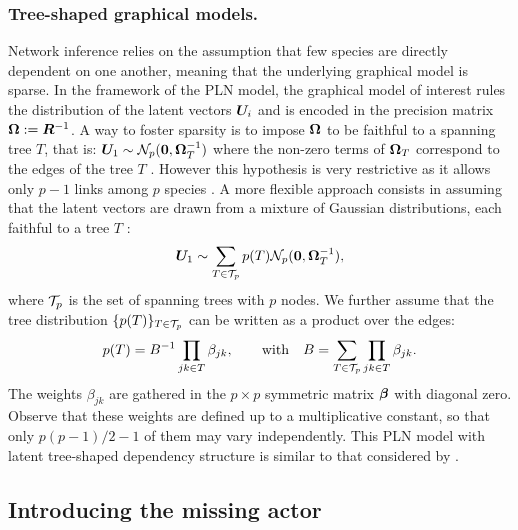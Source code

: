 \subsubsection*{Tree-shaped graphical models.} 
Network inference relies on the assumption that few species are directly dependent on one another, meaning that the underlying graphical model is sparse. In the framework of the PLN model, the graphical model of interest rules the distribution of the latent vectors ${\boldsymbol{U}}_i$ and is  encoded in the precision matrix ${\boldsymbol{\Omega}}:={\boldsymbol{R}}^{-1}$. A way to foster sparsity is to impose ${\boldsymbol{\Omega}}$ to be faithful to a spanning tree $T$, that is: ${\boldsymbol{U}}_1 \sim {\mathcal{N}}_p({\boldsymbol{0}}, {\boldsymbol{\Omega}}_T^{-1})$ where the non-zero terms of ${\boldsymbol{\Omega}}_T$ correspond to the edges of the tree $T$ . However this hypothesis is very restrictive  as it allows only $p-1$ links among $p$ species \citep{ChowLiu}. A more flexible approach consists in assuming that the latent vectors are drawn from a mixture of Gaussian distributions, each faithful to a tree $T$ \citep{MixtTrees,MeilaJaak,kirshner,SRS19}:
\begin{equation} \label{eq:mixt-Z}
{\boldsymbol{U}}_1 \sim \sum_{T \in {\mathcal{T}}_p} p(T) {\mathcal{N}}_p({\boldsymbol{0}}, {\boldsymbol{\Omega}}_T^{-1}),
\end{equation}
where ${\mathcal{T}}_p$ is the set of spanning trees with $p$ nodes.
We further assume that the tree distribution $\{p(T)\}_{T \in {\mathcal{T}}_p}$ can be written as a product over the edges:
\begin{equation} \label{eq:prob-T}
p(T) = B^{-1} \prod_{jk \in T} \beta_{jk}, \qquad
\text{with} \quad B = \sum_{T \in {\mathcal{T}}_p} \prod_{jk \in T} \beta_{jk}.
\end{equation}
The weights $\beta_{jk}$ are gathered in the $p \times p$ symmetric matrix ${\boldsymbol{\beta}}$ with diagonal zero. Observe that these weights are defined up to a multiplicative constant, so that only $p(p-1)/2 - 1$ of them may vary independently. This PLN model with latent tree-shaped dependency structure is similar to that considered by \cite{MRA20}.

\subsection{Introducing the missing actor} \label{sec:missActor}


